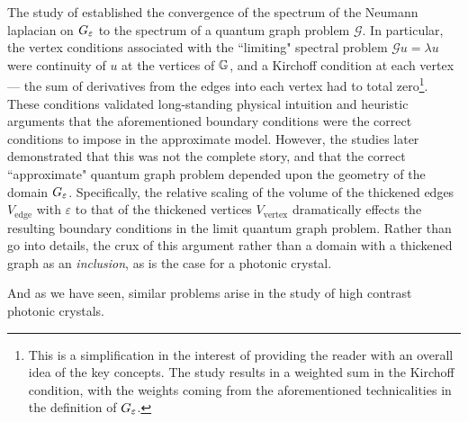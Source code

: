 The study of  established the convergence of the spectrum of the Neumann laplacian on $G_{\varepsilon}$ to the spectrum of a quantum graph problem $\mathcal{G}$.
In particular, the vertex conditions associated with the ``limiting" spectral problem $\mathcal{G}u = \lambda u$ were continuity of $u$ at the vertices of $\mathbb{G}$, and a Kirchoff condition at each vertex --- the sum of derivatives from the edges into each vertex had to total zero\footnote{This is a simplification in the interest of providing the reader with an overall idea of the key concepts. The study  results in a weighted sum in the Kirchoff condition, with the weights coming from the aforementioned technicalities in the definition of $G_{\varepsilon}$.}.
These conditions validated long-standing physical intuition and heuristic arguments that the aforementioned boundary conditions were the correct conditions to impose in the approximate model.
However, the studies  later demonstrated that this was not the complete story, and that the correct ``approximate" quantum graph problem depended upon the geometry of the domain $G_{\varepsilon}$.
Specifically, the relative scaling of the volume of the thickened edges $V_{\mathrm{edge}}$ with $\varepsilon$ to that of the thickened vertices $V_{\mathrm{vertex}}$ dramatically effects the resulting boundary conditions in the limit quantum graph problem. 
Rather than go into details, the crux of this argument
 rather than a domain with a thickened graph as an \emph{inclusion}, as is the case for a photonic crystal.

And as we have seen,   similar problems arise in the study of high contrast photonic crystals.
